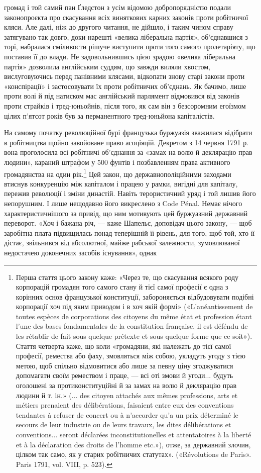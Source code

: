 громад і той самий пан Ґледстон з усім відомою добропорядністю
подали законопроєкта про скасування всіх виняткових карних
законів проти робітничої кляси. Але далі, ніж до другого читання,
не дійшло, і таким чином справу затягувано так довго, доки
нарешті «велика ліберальна партія», об’єднавшися з торі, набралася
сміливости рішуче виступити проти того самого пролетаріяту,
що поставив її до влади. Не задовольнившись цією зрадою
«велика ліберальна партія» дозволила англійським суддям,
що завжди виляли хвостом, вислуговуючись перед панівними
клясами, відкопати знову старі закони проти «конспірації»
і застосовувати їх проти робітничих об’єднань. Як бачимо,
лише проти волі й під натиском мас англійський парлямент відмовився
від законів проти страйків і тред-юньойнів, після того,
як сам він з безсоромним егоїзмом цілих п’ятсот років був за
перманентного тред-юньйона капіталістів.

На самому початку революційної бурі французька буржуазія
зважилася відібрати в робітництва щойно завойоване право
асоціяцій. Декретом з 14 червня 1791 р. вона проголосила всі
робітничі об’єднання за «замах на волю й деклярацію прав людини»,
караний штрафом у 500 фунтів і позбавленням права
активного громадянства на один рік.\footnote{
Перша стаття цього закону каже: «Через те, що скасування
всякого роду корпорацій громадян того самого стану й тієї самої професії
є одна з корінних основ французької конституції, забороняється відбудовувати
подібні корпорації хоч під яким приводом і в хоч якій формі»
(«L’anéantissement de toutes espèces de corporations des citoyens du même
état et profession étant l’une des bases fondamentales de la constitution
française, il est déféndu de les rétablir de fait sous quelque prétexte et
sous quelque forme que ce soit»). Стаття четверта каже, що коли «громадяни,
які належать до тієї самої професії, ремества або фаху, змовляться
між собою, укладуть угоду з тією метою, щоб спільно відмовитися
або лише за певну ціну згоджуватися допомагати своїм ремеством і праце,
— всі оті змови й угоди... будуть оголошені за протиконституційні
й за замах на волю й деклярацію прав людини й т. ін.» (... des citoyen
attachés aux mêmes professions, arts et métiers prenaient des délibérations,
faisaient entre eux des conventions tendantes à refuser de concert ou
à n’accorder qu’a un prix déterminé le secours de leur industrie ou de
leurs travaux, les dites délibérations et conventions... seront déclarées
inconstitutionelles et attentatoires à la liberté et à la déclaration des
droits de l’homme etc.»), отже, за державний злочин, цілком так само,
як у старих робітничих статутах». («Révolutions de Paris». Paris 1791,
vol. VIII, p. 523).
} Цей закон, що державнополіційними
заходами втиснув конкуренцію між капіталом і
працею у рамки, вигідні для капіталу, пережив революції і зміни
династій. Навіть терористичний уряд і той лишив його непорушним.
І лише нещодавно його викреслено з Code Pénal. Немає
нічого характеристичнішого за привід, що ним мотивують
цей буржуазний державний переворот. «Хоч і бажана річ, —
каже Шапельє, доповідач цього закону, — щоб заробітна плата підвищилась
понад теперішній її рівень, для того, щоб той, хто її
дістає, звільнився від абсолютної, майже рабської залежности,
зумовлюваної недостачею доконечних засобів існування», однак